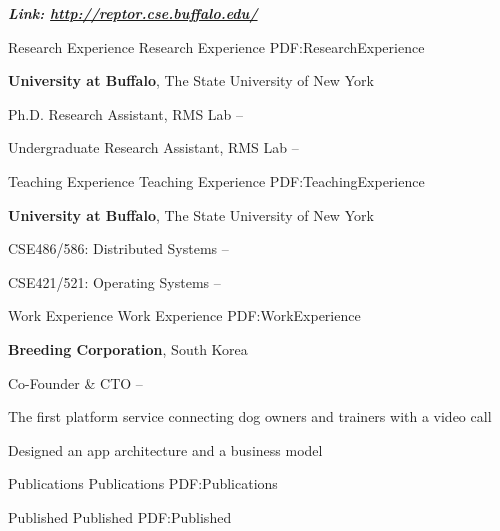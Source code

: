 \documentclass[letterpaper,MMMyyyy,nonstopmode]{simpleresumecv}
\begin{document}
\begin{Body}
\hspace{2ex}
\textbf{\textit{Link: \href{http://reptor.cse.buffalo.edu/}{http://reptor.cse.buffalo.edu/}}}
\hfill



\Section
{Research Experience}
{Research Experience}
{PDF:ResearchExperience}

\Entry
\textbf{University at Buffalo}, The State University of New York

\Gap
\BulletItem
Ph.D. Research Assistant, RMS Lab
\hfill
{} --

\Gap
\BulletItem
Undergraduate Research Assistant, RMS Lab
\hfill
{} --


\Section
{Teaching Experience}
{Teaching Experience}
{PDF:TeachingExperience}

\Entry
\textbf{University at Buffalo}, The State University of New York

\Gap
\BulletItem
CSE486/586: Distributed Systems
\hfill
{} --

\Gap
\BulletItem
CSE421/521: Operating Systems
\hfill
{} --



\Section
{Work Experience}
{Work Experience}
{PDF:WorkExperience}

\Entry
\textbf{Breeding Corporation}, South Korea

\Gap
\BulletItem
Co-Founder \& CTO
\hfill
{} --

\Gap
\BulletItem
The first platform service connecting dog owners and trainers with a video call
\hfill

\Gap
\BulletItem
Designed an app architecture and a business model
\hfill




\Section
{Publications}
{Publications}
{PDF:Publications}


\SubSection
{Published}
{Published}
{PDF:Published}

\begingroup
\renewcommand{\MaxNumberedItem}{[88]}


\end{Body}
\end{document}
